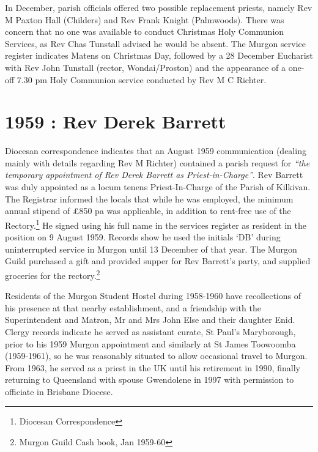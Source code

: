In December, parish officials offered two possible replacement priests, namely Rev M Paxton Hall (Childers) and Rev Frank Knight (Palmwoods). There was concern that no one was available to conduct Christmas Holy Communion Services, as Rev Chas Tunstall advised he would be absent. The Murgon service register indicates Matens on Christmas Day, followed by a 28 December Eucharist with Rev John Tunstall (rector, Wondai/Proston) and the appearance of a one-off 7.30 pm Holy Communion service conducted by Rev M C Richter.



\section{1959 : Rev Derek Barrett}



Diocesan correspondence indicates that an August 1959 communication (dealing mainly with details regarding Rev M Richter) contained a parish request for \emph{``the temporary appointment of Rev Derek Barrett as Priest-in-Charge''}. Rev Barrett was duly appointed as a locum tenens Priest-In-Charge of the Parish of Kilkivan. The Registrar informed the locals that while he was employed, the minimum annual stipend of \pounds850 pa was applicable, in addition to rent-free use of the Rectory.\footnote{Diocesan Correspondence} He signed using his full name in the services register as resident in the position on 9 August 1959. Records show he used the initials `DB' during uninterrupted service in Murgon until 13 December of that year. The Murgon Guild purchased a gift and provided supper for Rev Barrett's party, and supplied groceries for the rectory.\footnote{Murgon Guild Cash book, Jan 1959-60}


Residents of the Murgon Student Hostel during 1958-1960 have recollections of his presence at that nearby establishment, and a friendship with the Superintendent and Matron, Mr and Mrs John Else and their daughter Enid. Clergy records indicate he served as assistant curate, St Paul's Maryborough, prior to his 1959 Murgon appointment and similarly at St James Toowoomba (1959-1961), so he was reasonably situated to allow occasional travel to Murgon. From 1963, he served as a priest in the UK until his retirement in 1990, finally returning to Queensland with spouse Gwendolene in 1997 with permission to officiate in Brisbane Diocese.



\balance


